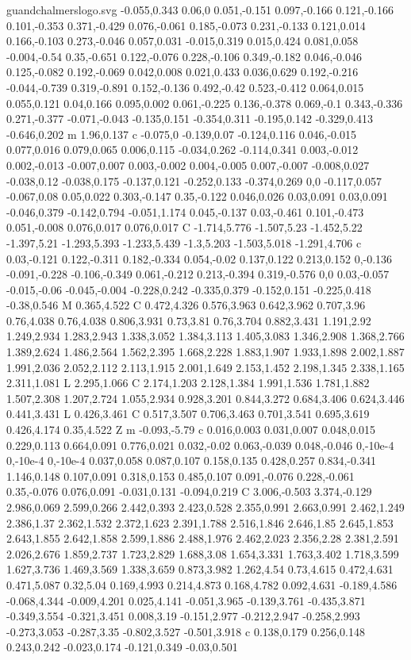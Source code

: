 \begin{filecontents}[noheader]{guandchalmerslogo.svg}
-0.055,0.343 0.06,0 0.051,-0.151 0.097,-0.166 0.121,-0.166 0.101,-0.353 0.371,-0.429 0.076,-0.061 0.185,-0.073 0.231,-0.133 0.121,0.014 0.166,-0.103 0.273,-0.046 0.057,0.031 -0.015,0.319 0.015,0.424 0.081,0.058 -0.004,-0.54 0.35,-0.651 0.122,-0.076 0.228,-0.106 0.349,-0.182 0.046,-0.046 0.125,-0.082 0.192,-0.069 0.042,0.008 0.021,0.433 0.036,0.629 0.192,-0.216 -0.044,-0.739 0.319,-0.891 0.152,-0.136 0.492,-0.42 0.523,-0.412 0.064,0.015 0.055,0.121 0.04,0.166 0.095,0.002 0.061,-0.225 0.136,-0.378 0.069,-0.1 0.343,-0.336 0.271,-0.377 -0.071,-0.043 -0.135,0.151 -0.354,0.311 -0.195,0.142 -0.329,0.413 -0.646,0.202 m 1.96,0.137 c -0.075,0 -0.139,0.07 -0.124,0.116 0.046,-0.015 0.077,0.016 0.079,0.065 0.006,0.115 -0.034,0.262 -0.114,0.341 0.003,-0.012 0.002,-0.013 -0.007,0.007 0.003,-0.002 0.004,-0.005 0.007,-0.007 -0.008,0.027 -0.038,0.12 -0.038,0.175 -0.137,0.121 -0.252,0.133 -0.374,0.269 0,0 -0.117,0.057 -0.067,0.08 0.05,0.022 0.303,-0.147 0.35,-0.122 0.046,0.026 0.03,0.091 0.03,0.091 -0.046,0.379 -0.142,0.794 -0.051,1.174 0.045,-0.137 0.03,-0.461 0.101,-0.473 0.051,-0.008 0.076,0.017 0.076,0.017 C -1.714,5.776 -1.507,5.23 -1.452,5.22 -1.397,5.21 -1.293,5.393 -1.233,5.439 -1.3,5.203 -1.503,5.018 -1.291,4.706 c 0.03,-0.121 0.122,-0.311 0.182,-0.334 0.054,-0.02 0.137,0.122 0.213,0.152 0,-0.136 -0.091,-0.228 -0.106,-0.349 0.061,-0.212 0.213,-0.394 0.319,-0.576 0,0 0.03,-0.057 -0.015,-0.06 -0.045,-0.004 -0.228,0.242 -0.335,0.379 -0.152,0.151 -0.225,0.418 -0.38,0.546 M 0.365,4.522 C 0.472,4.326 0.576,3.963 0.642,3.962 0.707,3.96 0.76,4.038 0.76,4.038 0.806,3.931 0.73,3.81 0.76,3.704 0.882,3.431 1.191,2.92 1.249,2.934 1.283,2.943 1.338,3.052 1.384,3.113 1.405,3.083 1.346,2.908 1.368,2.766 1.389,2.624 1.486,2.564 1.562,2.395 1.668,2.228 1.883,1.907 1.933,1.898 2.002,1.887 1.991,2.036 2.052,2.112 2.113,1.915 2.001,1.649 2.153,1.452 2.198,1.345 2.338,1.165 2.311,1.081 L 2.295,1.066 C 2.174,1.203 2.128,1.384 1.991,1.536 1.781,1.882 1.507,2.308 1.207,2.724 1.055,2.934 0.928,3.201 0.844,3.272 0.684,3.406 0.624,3.446 0.441,3.431 L 0.426,3.461 C 0.517,3.507 0.706,3.463 0.701,3.541 0.695,3.619 0.426,4.174 0.35,4.522 Z m -0.093,-5.79 c 0.016,0.003 0.031,0.007 0.048,0.015 0.229,0.113 0.664,0.091 0.776,0.021 0.032,-0.02 0.063,-0.039 0.048,-0.046 0,-10e-4 0,-10e-4 0,-10e-4 0.037,0.058 0.087,0.107 0.158,0.135 0.428,0.257 0.834,-0.341 1.146,0.148 0.107,0.091 0.318,0.153 0.485,0.107 0.091,-0.076 0.228,-0.061 0.35,-0.076 0.076,0.091 -0.031,0.131 -0.094,0.219 C 3.006,-0.503 3.374,-0.129 2.986,0.069 2.599,0.266 2.442,0.393 2.423,0.528 2.355,0.991 2.663,0.991 2.462,1.249 2.386,1.37 2.362,1.532 2.372,1.623 2.391,1.788 2.516,1.846 2.646,1.85 2.645,1.853 2.643,1.855 2.642,1.858 2.599,1.886 2.488,1.976 2.462,2.023 2.356,2.28 2.381,2.591 2.026,2.676 1.859,2.737 1.723,2.829 1.688,3.08 1.654,3.331 1.763,3.402 1.718,3.599 1.627,3.736 1.469,3.569 1.338,3.659 0.873,3.982 1.262,4.54 0.73,4.615 0.472,4.631 0.471,5.087 0.32,5.04 0.169,4.993 0.214,4.873 0.168,4.782 0.092,4.631 -0.189,4.586 -0.068,4.344 -0.009,4.201 0.025,4.141 -0.051,3.965 -0.139,3.761 -0.435,3.871 -0.349,3.554 -0.321,3.451 0.008,3.19 -0.151,2.977 -0.212,2.947 -0.258,2.993 -0.273,3.053 -0.287,3.35 -0.802,3.527 -0.501,3.918 c 0.138,0.179 0.256,0.148 0.243,0.242 -0.023,0.174 -0.121,0.349 -0.03,0.501 
\end{filecontents}
